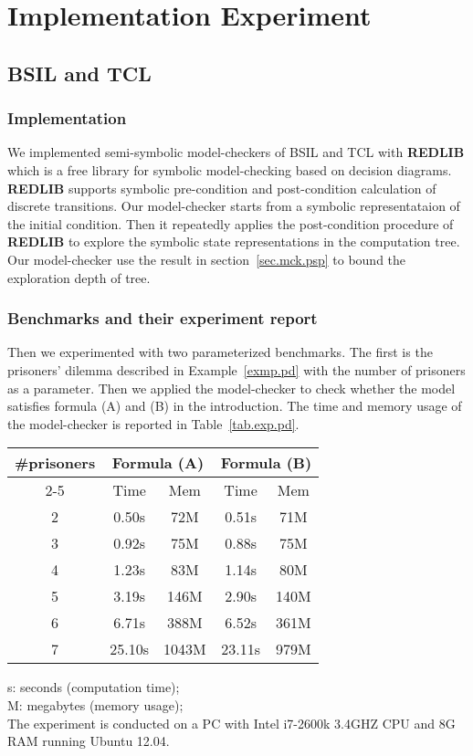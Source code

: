 \chapter{Implementation Experiment}
\section{BSIL and TCL}
\subsection{Implementation} 

We implemented semi-symbolic model-checkers of BSIL and TCL with {\bf REDLIB} 
\cite{Wang03,Wang08a,Wang08b,Wang13,Wang14}
which is a free library for symbolic model-checking based on decision diagrams. 
{\bf REDLIB} supports symbolic pre-condition and post-condition calculation of discrete transitions.  
Our model-checker starts from a symbolic representataion of the initial condition. 
Then it repeatedly applies the post-condition procedure of {\bf REDLIB} to explore the symbolic state representations in the computation tree.
Our model-checker use the result in section~\ref{sec.mck.psp} to bound the exploration depth of tree.   

\subsection{Benchmarks and their experiment report} 

Then we experimented with two parameterized benchmarks.  
The first is the prisoners' dilemma described in Example~\ref{exmp.pd} with the number of prisoners as a parameter.
Then we applied the model-checker to check whether the model satisfies formula (A) and (B) in the introduction.
The time and memory usage of the model-checker is reported in Table~\ref{tab.exp.pd}.
\begin{table*}[!th]
\caption{Experiment data for the prisoners' dilemma model}
\label{tab.exp.pd}
\begin{center}
\begin{tabular}{c||c|c||c|c} \hline
\multirow{2}{*}{\#prisoners}  &\multicolumn{2}{c||}{Formula (A)} & \multicolumn{2}{c}{Formula (B)}\\ \cline{2-5}
& Time & Mem  & Time & Mem\\ \hline
2 &0.50s &72M   &0.51s &71M \\
3 &0.92s &75M   &0.88s &75M \\
4 &1.23s &83M   &1.14s &80M \\
5 &3.19s &146M  &2.90s &140M \\
6 &6.71s &388M  &6.52s &361M \\
7 &25.10s&1043M &23.11s&979M \\ \hline
\end{tabular}
\hspace*{10mm}
\parbox{50mm}{
s: seconds (computation time); \\
M: megabytes (memory usage); \\[2mm]
The experiment is conducted on a PC with Intel i7-2600k 3.4GHZ CPU 
and 8G RAM running Ubuntu 12.04. 
}
\end{center}
\end{table*}

